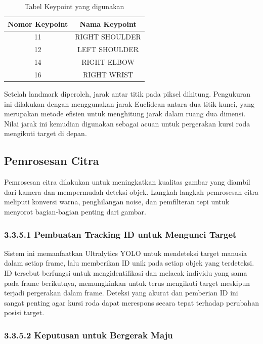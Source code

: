 \begin{table}[H]
\centering
\begin{tabular}{|c|c|}
\hline
Nomor Keypoint & Nama Keypoint \\
\hline
11 & RIGHT SHOULDER \\
12 & LEFT SHOULDER \\
14 & RIGHT ELBOW \\
16 & RIGHT WRIST \\
\hline
\end{tabular}
\caption{Tabel Keypoint yang digunakan}
\label{tab:keypoints}
\end{table}

Setelah landmark diperoleh, jarak antar titik pada piksel dihitung. Pengukuran ini dilakukan dengan menggunakan jarak Euclidean antara dua titik kunci, yang merupakan metode efisien untuk menghitung jarak dalam ruang dua dimensi. Nilai jarak ini kemudian digunakan sebagai acuan untuk pergerakan kursi roda mengikuti target di depan.

\subsection{Pemrosesan Citra}
\label{subsec:pemrosesan_citra}

Pemrosesan citra dilakukan untuk meningkatkan kualitas gambar yang diambil dari kamera dan mempermudah deteksi objek. Langkah-langkah pemrosesan citra meliputi konversi warna, penghilangan noise, dan pemfilteran tepi untuk menyorot bagian-bagian penting dari gambar.

\subsubsection{3.3.5.1 Pembuatan Tracking ID untuk Mengunci Target}
\label{subsubsec:tracking_id}

Sistem ini memanfaatkan Ultralytics YOLO untuk mendeteksi target manusia dalam setiap frame, lalu memberikan ID unik pada setiap objek yang terdeteksi. ID tersebut berfungsi untuk mengidentifikasi dan melacak individu yang sama pada frame berikutnya, memungkinkan untuk terus mengikuti target meskipun terjadi pergerakan dalam frame. Deteksi yang akurat dan pemberian ID ini sangat penting agar kursi roda dapat merespons secara tepat terhadap perubahan posisi target.

\subsubsection{3.3.5.2 Keputusan untuk Bergerak Maju}
\label{subsubsec:keputusan_bergerak_maju}

